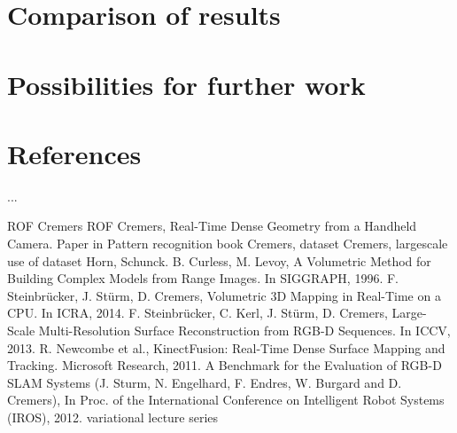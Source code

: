 \documentclass[conference]{IEEEtran}
\begin{document}
\section{Comparison of results}
\section{Possibilities for further work}

\section*{References}
...

\begin{thebibliography}{00}
    ROF
    Cremers ROF
    Cremers, Real-Time Dense Geometry from a Handheld Camera.
    Paper in Pattern recognition book
    Cremers, dataset
    Cremers, largescale use of dataset
    Horn, Schunck.
    B. Curless, M. Levoy, A Volumetric Method for Building Complex Models from Range Images. In SIGGRAPH, 1996.
    F. Steinbr\"ucker, J. St\"urm, D. Cremers, Volumetric 3D Mapping in Real-Time on a CPU. In ICRA, 2014.
    F. Steinbr\"ucker, C. Kerl, J. St\"urm, D. Cremers, Large-Scale Multi-Resolution Surface Reconstruction from RGB-D Sequences. In ICCV, 2013.
    R. Newcombe et al., KinectFusion: Real-Time Dense Surface Mapping and Tracking. Microsoft Research, 2011.
    A Benchmark for the Evaluation of RGB-D SLAM Systems (J. Sturm, N. Engelhard, F. Endres, W. Burgard and D. Cremers), In Proc. of the International Conference on Intelligent Robot Systems (IROS), 2012. 
    variational lecture series
\end{thebibliography}
\end{document}
